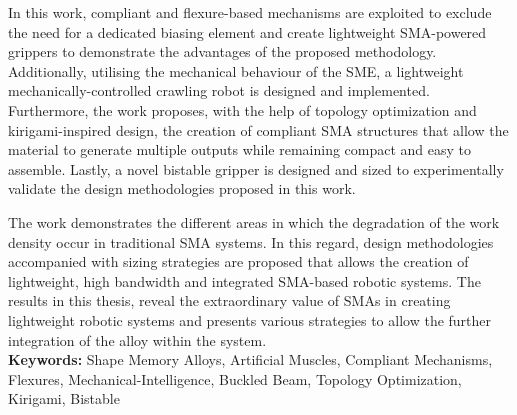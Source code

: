 In this work, compliant and flexure-based mechanisms are exploited to exclude the need for a dedicated biasing element and create lightweight SMA-powered grippers to demonstrate the advantages of the proposed methodology. Additionally, utilising the mechanical behaviour of the SME, a lightweight mechanically-controlled crawling robot is designed and implemented. Furthermore, the work proposes, with the help of topology optimization and kirigami-inspired design, the creation of compliant SMA structures that allow the material to generate multiple outputs while remaining compact and easy to assemble. Lastly, a novel bistable gripper is designed and sized to experimentally validate the design methodologies proposed in this work.

The work demonstrates the different areas in which the degradation of the work density occur in traditional SMA systems. In this regard, design methodologies accompanied with sizing strategies are proposed that allows the creation of lightweight, high bandwidth and integrated SMA-based robotic systems. The results in this thesis, reveal the extraordinary value of SMAs in creating lightweight robotic systems and presents various strategies to allow the further integration of the alloy within the system.\\

\textbf{Keywords:} Shape Memory Alloys, Artificial Muscles, Compliant Mechanisms, Flexures, Mechanical-Intelligence, Buckled Beam, Topology Optimization, Kirigami, Bistable

